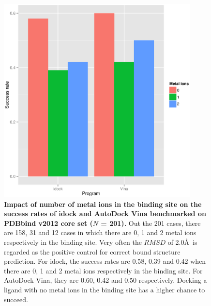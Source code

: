 \documentclass[10pt]{article}
\begin{document}
\begin{figure}[!ht]
\begin{center}
\includegraphics[width=4in]{Program-NIONS.eps}
\end{center}
\caption{
{\bf Impact of number of metal ions in the binding site on the success rates of idock and AutoDock Vina benchmarked on PDBbind v2012 core set ($N$ = 201).} Out the 201 cases, there are 158, 31 and 12 cases in which there are 0, 1 and 2 metal ions respectively in the binding site. Very often the $RMSD$ of 2.0\AA\ is regarded as the positive control for correct bound structure prediction. For idock, the success rates are 0.58, 0.39 and 0.42 when there are 0, 1 and 2 metal ions respectively in the binding site. For AutoDock Vina, they are 0.60, 0.42 and 0.50 respectively. Docking a ligand with no metal ions in the binding site has a higher chance to succeed.
}
\label{Program-NIONS}
\end{figure}
\end{document}
